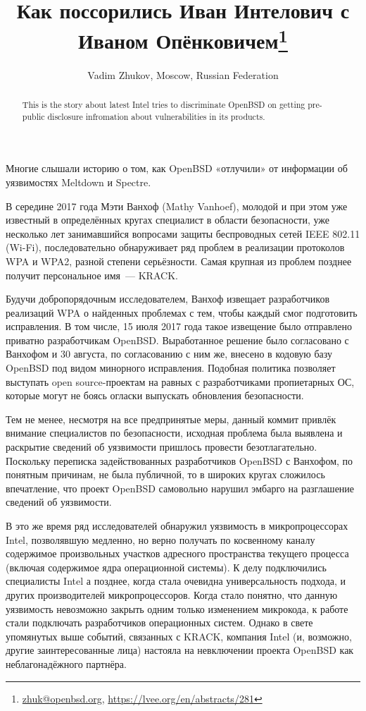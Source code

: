 \documentclass[10pt, a5paper]{article}
\begin{document}
\title{Как поссорились Иван Интелович с Иваном Опёнковичем\footnote{\url{zhuk@openbsd.org}, \url{https://lvee.org/en/abstracts/281}}}
\author{Vadim Zhukov, Moscow, Russian Federation}
\maketitle
\begin{abstract}
This is the story about latest Intel tries to discriminate OpenBSD on getting pre-public disclosure infromation about vulnerabilities in its products.
\end{abstract}
Многие слышали историю о том, как OpenBSD «отлучили» от информации об уязвимостях Meltdown и Spectre.

В середине 2017 года Мэти Ванхоф (Mathy Vanhoef), молодой и при этом уже известный в определённых кругах специалист в области безопасности, уже несколько лет занимавшийся вопросами защиты беспроводных сетей IEEE 802.11 (Wi-Fi), последовательно обнаруживает ряд проблем в реализации протоколов WPA и WPA2, разной степени серьёзности. Самая крупная из проблем позднее получит персональное имя~--- KRACK.

Будучи добропорядочным исследователем, Ванхоф извещает разработчиков реализаций WPA о найденных проблемах с тем, чтобы каждый смог подготовить исправления. В том числе, 15 июля 2017 года такое извещение было отправлено приватно разработчикам OpenBSD. Выработанное решение было согласовано с Ванхофом и 30 августа, по согласованию с ним же, внесено в кодовую базу OpenBSD под видом минорного исправления. Подобная политика позволяет выступать open source-проектам на равных с разработчиками пропиетарных ОС, которые могут не боясь огласки выпускать обновления безопасности.

Тем не менее, несмотря на все предпринятые меры, данный коммит привлёк внимание специалистов по безопасности, исходная проблема была выявлена и раскрытие сведений об уязвимости пришлось провести безотлагательно. Поскольку переписка задействованных разработчиков OpenBSD с Ванхофом, по понятным причинам, не была публичной, то в широких кругах сложилось впечатление, что проект OpenBSD самовольно нарушил эмбарго на разглашение сведений об уязвимости.

В это же время ряд исследователей обнаружил уязвимость в микропроцессорах Intel, позволявшую медленно, но верно получать по косвенному каналу содержимое произвольных участков адресного пространства текущего процесса (включая содержимое ядра операционной системы). К делу подключились специалисты Intel а позднее, когда стала очевидна универсальность подхода, и других производителей микропроцессоров. Когда стало понятно, что данную уязвимость невозможно закрыть одним только изменением микрокода, к работе стали подключать разработчиков операционных систем. Однако в свете упомянутых выше событий, связанных с KRACK, компания Intel (и, возможно, другие заинтересованные лица) настояла на невключении проекта OpenBSD как неблагонадёжного партнёра.
\end{document}

